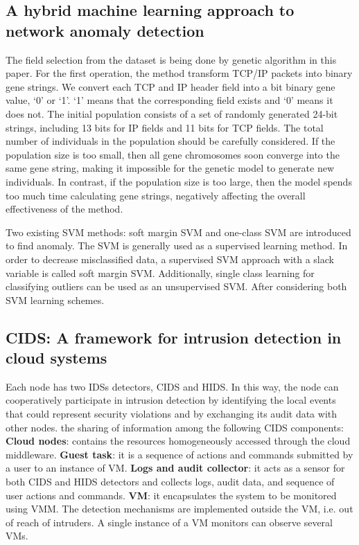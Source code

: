 \documentclass[a4paper, 12pt]{article}
\begin{document}
\subsection{A hybrid machine learning approach to network
anomaly detection}
\hspace{1cm} The field selection from the dataset is being done by genetic algorithm in this paper. 
For the first operation, the method transform TCP/IP packets into binary gene strings. We convert each TCP and IP
header field into a bit binary gene value, ‘0’ or ‘1’. ‘1’ means that the corresponding field exists and ‘0’ means it
does not. The initial population consists of a set of randomly generated 24-bit strings, including 13 bits for IP
fields and 11 bits for TCP fields. The total number of individuals in the population should be carefully considered.
If the population size is too small, then all gene chromosomes soon converge into the same gene
string, making it impossible for the genetic model to generate new individuals. In contrast, if the population
size is too large, then the model spends too much time calculating gene strings, negatively affecting the overall
effectiveness of the method.
\par Two existing SVM methods: soft margin SVM and one-class SVM are introduced to find anomaly. The SVM is generally used as a supervised learning method. In order to decrease misclassified data, a supervised SVM approach with a slack variable is called soft margin SVM. Additionally, single class learning for classifying outliers can be used as an unsupervised SVM. After considering both SVM learning schemes.

\subsection{CIDS: A framework for intrusion detection
in cloud systems}
\hspace{1cm}  
Each node has two IDSs detectors, CIDS and HIDS. In this way, the node can cooperatively participate in intrusion detection by identifying the local events that could represent security violations and by exchanging its audit data with other nodes.
the sharing of information among the following CIDS components:
\textbf{Cloud nodes}: contains the resources homogeneously accessed through the cloud middleware.
\textbf{Guest task}: it is a sequence of actions and commands submitted by a user to an instance of VM.
\textbf{Logs and audit collector}: it acts as a sensor for both CIDS and HIDS detectors and collects logs, audit data, and sequence of user actions and commands.
\textbf{VM}: it encapsulates the system to be monitored using VMM. The detection mechanisms are implemented outside the VM, i.e. out of reach of intruders. A single instance of a VM monitors can observe several VMs.
\end{document}
